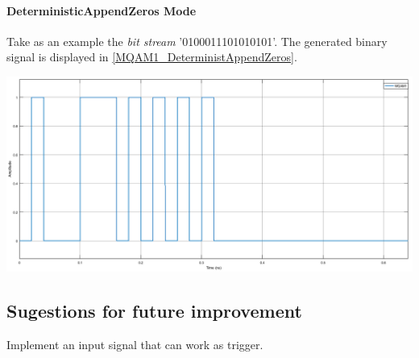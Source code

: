 \documentclass[a4paper]{article}
\begin{document}
\paragraph*{DeterministicAppendZeros Mode}

Take as an example the \textit{bit stream} '0100011101010101'. The generated binary signal is displayed in \ref{MQAM1_DeterministAppendZeros}.

\begin{center}
	\includegraphics[width=\textwidth]{MQAM1_DeterministAppendZeros}
	\label{MQAM1_DeterministAppendZeros}
\end{center}

\subsection*{Sugestions for future improvement}

Implement an input signal that can work as trigger.
\end{document}
